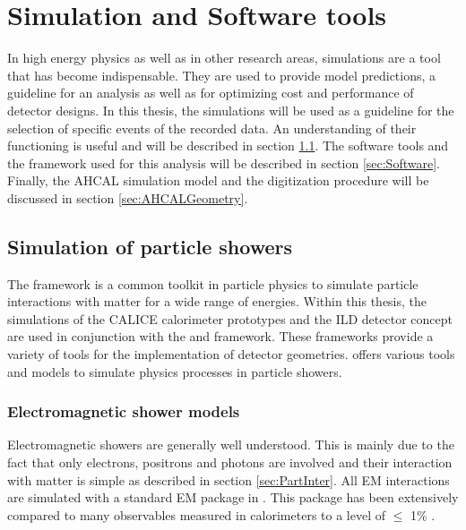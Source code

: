 \chapter{Simulation and Software tools}
\label{chap:G4Simulation}

In high energy physics as well as in other research areas, simulations are a tool that has become indispensable. They are used to provide model predictions, a guideline for an analysis as well as for optimizing cost and performance of detector designs. In this thesis, the simulations will be used as a guideline for the selection of specific events of the recorded data. An understanding of their functioning is useful and will be described in section \ref{sec:SimModels}. The software tools and the \ilcsoft framework used for this analysis will be described in section \ref{sec:Software}. Finally, the AHCAL simulation model and the digitization procedure will be discussed in section \ref{sec:AHCALGeometry}.

\section{Simulation of particle showers}
\label{sec:SimModels}

The \geant framework \cite{Agostinelli2003} is a common toolkit in particle physics to simulate particle interactions with matter for a wide range of energies. Within this thesis, the simulations of the CALICE calorimeter prototypes and the ILD detector concept are used in conjunction with the \mokka \cite{Freitas2003} and \ddhep \cite{Frank2014} framework. These frameworks provide a variety of tools for the implementation of detector geometries. \geant offers various tools and models to simulate physics processes in particle showers.

\subsection{Electromagnetic shower models}

Electromagnetic showers are generally well understood. This is mainly due to the fact that only electrons, positrons and photons are involved and their interaction with matter is simple as described in section \ref{sec:PartInter}. All EM interactions are simulated with a standard EM package in \geant \cite{Ivanchenko2010}. This package has been extensively compared to many observables measured in calorimeters to a level of $\leq$ 1\% \cite{Apostolakis2015}.

